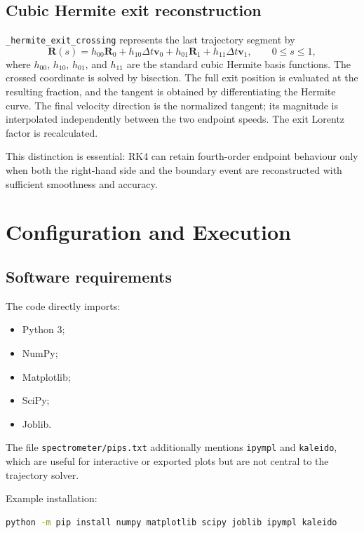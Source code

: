 \documentclass[11pt,a4paper]{report}
\newcommand{\code}[1]{\texttt{#1}}
\newcommand{\vect}[1]{\bm{#1}}
\begin{document}
\section{Cubic Hermite exit reconstruction}
\code{\_hermite\_exit\_crossing} represents the last trajectory segment by
\begin{equation}
  \vect{R}(s)=h_{00}\vect{R}_0+h_{10}\Delta t\vect{v}_0
             +h_{01}\vect{R}_1+h_{11}\Delta t\vect{v}_1,
  \qquad 0\le s\le1,
\end{equation}
where $h_{00}$, $h_{10}$, $h_{01}$, and $h_{11}$ are the standard cubic
Hermite basis functions.  The crossed coordinate is solved by bisection.  The
full exit position is evaluated at the resulting fraction, and the tangent is
obtained by differentiating the Hermite curve.  The final velocity direction
is the normalized tangent; its magnitude is interpolated independently
between the two endpoint speeds.  The exit Lorentz factor is recalculated.

This distinction is essential: RK4 can retain fourth-order endpoint behaviour
only when both the right-hand side and the boundary event are reconstructed
with sufficient smoothness and accuracy.

\chapter{Configuration and Execution}

\section{Software requirements}
The code directly imports:
\begin{itemize}[noitemsep]
  \item Python 3;
  \item NumPy;
  \item Matplotlib;
  \item SciPy;
  \item Joblib.
\end{itemize}
The file \code{spectrometer/pips.txt} additionally mentions \code{ipympl} and
\code{kaleido}, which are useful for interactive or exported plots but are not
central to the trajectory solver.

Example installation:
\begin{lstlisting}[language=bash]
python -m pip install numpy matplotlib scipy joblib ipympl kaleido
\end{lstlisting}
\end{document}
